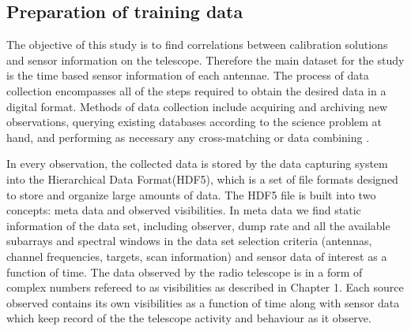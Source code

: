 \subsection{Preparation of training data}\label{prep}

The objective of this study is to find correlations between
calibration solutions and sensor information on the telescope.
Therefore the main dataset for the study is the time based
sensor information of each antennae.
The process of data collection encompasses all of the steps required to obtain the desired data in a digital format. Methods of data collection include acquiring and archiving new observations, querying existing databases according to the science
problem at hand, and performing as necessary any cross-matching or data combining  \citep{ball2010data}.


In every observation, the collected data is stored by the data capturing system into the Hierarchical Data Format(HDF5), which is a set of file formats designed to store and organize large amounts of data. The HDF5 file is built into two concepts: meta data and observed visibilities. In meta data we find static information of the data set, including observer, dump rate and all the available subarrays and spectral windows in the data set selection criteria (antennas, channel frequencies, targets, scan information) and sensor data of interest as a function of time. The data observed by the radio telescope is in a form of complex numbers refereed to as visibilities as described in Chapter 1. Each source observed contains its own visibilities as a function of time along with sensor data  which keep record of the the telescope activity and behaviour as it observe.

